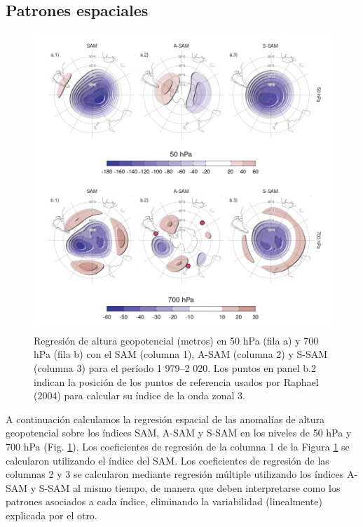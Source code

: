 \documentclass[12pt,oneside,a4paper]{reedthesis}
\begin{document}
\hypertarget{spatial}{%
\subsection{Patrones espaciales}\label{spatial}}



\begin{figure}

{\centering \includegraphics{figures/30-sam/2d-regr-1} 

}

\caption{Regresión de altura geopotencial (metros) en 50 hPa (fila a) y 700 hPa (fila b) con el SAM (columna 1), A-SAM (columna 2) y S-SAM (columna 3) para el período 1 979--2 020. Los puntos en panel b.2 indican la posición de los puntos de referencia usados por Raphael (2004) para calcular su índice de la onda zonal 3.}\label{fig:2d-regr}
\end{figure}

A continuación calculamos la regresión espacial de las anomalías de altura geopotencial sobre los índices SAM, A-SAM y S-SAM en los niveles de 50 hPa y 700 hPa (Fig. \ref{fig:2d-regr}).
Los coeficientes de regresión de la columna 1 de la Figura \ref{fig:2d-regr} se calcularon utilizando el índice del SAM.
Los coeficientes de regresión de las columnas 2 y 3 se calcularon mediante regresión múltiple utilizando los índices A-SAM y S-SAM al mismo tiempo, de manera que deben interpretarse como los patrones asociados a cada índice, eliminando la variabilidad (linealmente) explicada por el otro.
\end{document}
